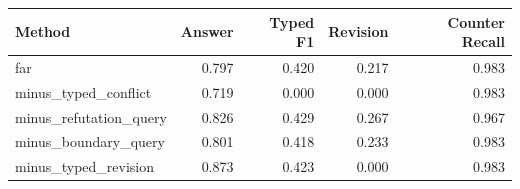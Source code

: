 \begin{tabular}{lrrrr}
\toprule
Method & Answer & Typed F1 & Revision & Counter Recall \\
\midrule
far & 0.797 & 0.420 & 0.217 & 0.983 \\
minus\_typed\_conflict & 0.719 & 0.000 & 0.000 & 0.983 \\
minus\_refutation\_query & 0.826 & 0.429 & 0.267 & 0.967 \\
minus\_boundary\_query & 0.801 & 0.418 & 0.233 & 0.983 \\
minus\_typed\_revision & 0.873 & 0.423 & 0.000 & 0.983 \\
\bottomrule
\end{tabular}
